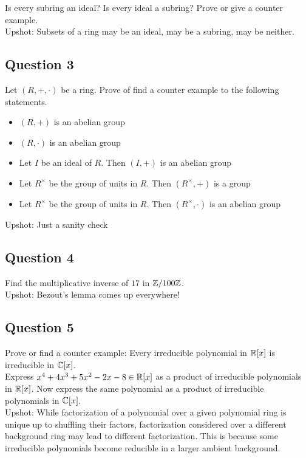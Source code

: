 \documentclass[a4paper]{article}
\begin{document}
Is every subring an ideal? Is every ideal a subring? Prove or give a counter example. \\

Upshot: Subsets of a ring may be an ideal, may be a subring, may be neither. 

\subsection*{Question 3}
Let $(R,+,\cdot)$ be a ring. Prove of find a counter example to the following statements. 
\begin{itemize}
\item $(R,+)$ is an abelian group
\item $(R,\cdot)$ is an abelian group
\item Let $I$ be an ideal of $R$. Then $(I,+)$ is an abelian group
\item Let $R^\times$ be the group of units in $R$. Then $(R^\times,+)$ is a group
\item Let $R^\times$ be the group of units in $R$. Then $(R^\times,\cdot)$ is an abelian group
\end{itemize}

Upshot: Just a sanity check

\subsection*{Question 4}
Find the multiplicative inverse of $17$ in $\mathbb{Z}/100\mathbb{Z}$. \\

Upshot: Bezout's lemma comes up everywhere!

\subsection*{Question 5}
Prove or find a counter example: Every irreducible polynomial in $\mathbb{R}[x]$ is irreducible in $\mathbb{C}[x]$. \\

Express $x^4+4x^3+5x^2-2x-8\in\mathbb{R}[x]$ as a product of irreducible polynomials in $\mathbb{R}[x]$. Now express the same polynomial as a product of irreducible polynomials in $\mathbb{C}[x]$. \\

Upshot: While factorization of a polynomial over a given polynomial ring is unique up to shuffling their factors, factorization considered over a different background ring may lead to different factorization. This is because some irreducible polynomials become reducible in a larger ambient background. 
\end{document}
